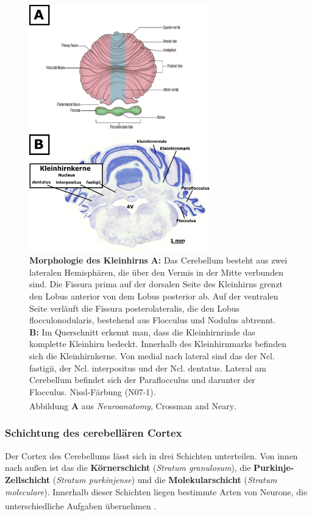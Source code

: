 \begin{figure}[H]
    \centering
    \includegraphics[width=0.7\textwidth]{pictures/Bilder_Laura/kleinhirn_ausen.png}
    \caption[Morphologie des Kleinhirns]{\textbf{Morphologie des Kleinhirns} \textbf{A:} Das Cerebellum besteht aus zwei lateralen Hemisphären, die über den Vermis in der Mitte verbunden sind. Die Fissura prima auf der dorsalen Seite des Kleinhirns grenzt den Lobus anterior von dem Lobus posterior ab. Auf der ventralen Seite verläuft die Fissura posterolateralis, die den Lobus flocculonodularis, bestehend aus Flocculus und Nodulus abtrennt. \textbf{B:} Im Querschnitt erkennt man, dass die Kleinhirnrinde das komplette Kleinhirn bedeckt. Innerhalb des Kleinhirnmarks befinden sich die Kleinhirnkerne. Von medial nach lateral sind das der Ncl. fastigii, der Ncl. interpositus und der Ncl. dentatus. Lateral am Cerebellum befindet sich der Paraflocculus und darunter der Flocculus. Nissl-Färbung (N07-1).\\ Abbildung \textbf{A} aus \textit{Neuroanatomy}, Crossman and Neary\textsuperscript{\cite[Kap.~11]{crossman2014neuroanatomy}}.}
    \label{fig:morph_kleinhirn}
\end{figure}

\subsubsection{Schichtung des cerebellären Cortex}
Der Cortex des Cerebellums lässt sich in drei Schichten unterteilen. Von innen nach außen ist das die \textbf{Körnerschicht} (\textit{Stratum granulosum}), die \textbf{Purkinje-Zellschicht} (\textit{Stratum purkinjense}) und die \textbf{Molekularschicht} (\textit{Stratum moleculare}). Innerhalb dieser Schichten liegen bestimmte Arten von Neurone, die unterschiedliche Aufgaben übernehmen \textsuperscript{\cite[Kap.~7]{trepel2011neuroanatomie}}.     

